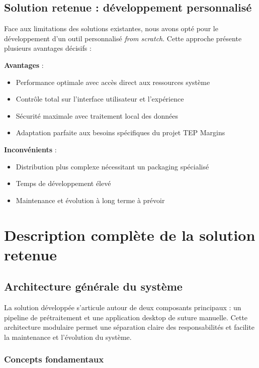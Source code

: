 \documentclass[12pt,a4paper]{report}
\begin{document}
\subsection{Solution retenue : développement personnalisé}

Face aux limitations des solutions existantes, nous avons opté pour le développement d'un outil personnalisé \textit{from scratch}. Cette approche présente plusieurs avantages décisifs :

\textbf{Avantages} :
\begin{itemize}
\item Performance optimale avec accès direct aux ressources système
\item Contrôle total sur l'interface utilisateur et l'expérience
\item Sécurité maximale avec traitement local des données
\item Adaptation parfaite aux besoins spécifiques du projet TEP Margins
\end{itemize}

\textbf{Inconvénients} :
\begin{itemize}
\item Distribution plus complexe nécessitant un packaging spécialisé
\item Temps de développement élevé
\item Maintenance et évolution à long terme à prévoir
\end{itemize}

\section{Description complète de la solution retenue}

\subsection{Architecture générale du système}

La solution développée s'articule autour de deux composants principaux : un pipeline de prétraitement et une application desktop de suture manuelle. Cette architecture modulaire permet une séparation claire des responsabilités et facilite la maintenance et l'évolution du système.

\subsubsection{Concepts fondamentaux}
\end{document}
